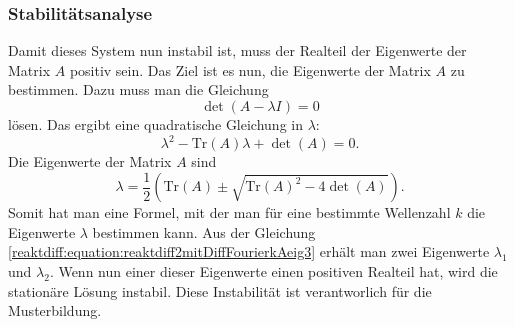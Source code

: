 
\subsubsection{Stabilitätsanalyse}
Damit dieses System nun instabil ist, muss der Realteil der Eigenwerte der Matrix \(A\) positiv sein.
Das Ziel ist es nun, die Eigenwerte der Matrix \(A\) zu bestimmen.
Dazu muss man die Gleichung
\begin{equation*}
    \det(A - \lambda I) = 0
\end{equation*}
lösen.
Das ergibt eine quadratische Gleichung in \(\lambda\):
%
\begin{equation*}
    \lambda^2 - \text{Tr}(A) \lambda + \det(A) = 0.
\end{equation*}
Die Eigenwerte der Matrix \(A\) sind
\begin{equation}
    \lambda = \frac{1}{2} \left( \text{Tr}(A) \pm 
    \!\sqrt{\text{Tr}(A)^2 - 4 \det(A)} \right).
\label{reaktdiff:equation:reaktdiff2mitDiffFourierkAeig3}
\end{equation}
Somit hat man eine Formel, mit der man für eine bestimmte Wellenzahl \(k\) die Eigenwerte \(\lambda\) bestimmen kann.
Aus der Gleichung \eqref{reaktdiff:equation:reaktdiff2mitDiffFourierkAeig3} erhält man zwei Eigenwerte \(\lambda_1\) und \(\lambda_2\).
Wenn nun einer dieser Eigenwerte einen positiven Realteil hat, wird die stationäre Lösung instabil.
Diese Instabilität ist verantworlich für die Musterbildung.


